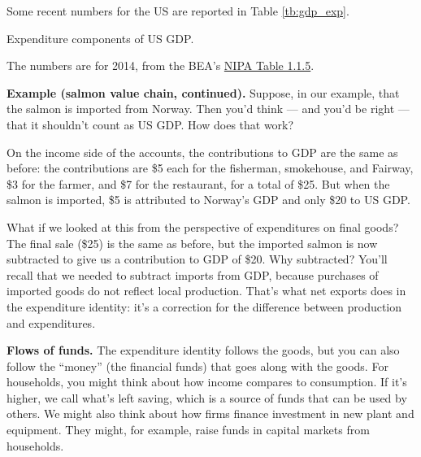 Some recent numbers for the US are reported in Table \ref{tb:gdp_exp}.

\begin{table}[!ht]
\centering
\caption{Expenditure components of US GDP.}
\label{tb:gdp_exp}

\begin{minipage}{0.95\textwidth}
\footnotesize{%
\smallskip
The numbers are for 2014,
from the BEA's
\href{http://www.bea.gov/iTable/iTableHtml.cfm?reqid=9&step=3&isuri=1&903=5}{NIPA Table 1.1.5}.
}
\end{minipage}
\end{table}

\textbf{Example (salmon value chain, continued).}
Suppose, in our example, that the salmon is imported from Norway.
Then you'd think --- and you'd be right --- that it shouldn't
count as US GDP.
How does that work?

On the income side of the accounts, the
contributions to GDP are the same as before:
the contributions are \$5 each for the fisherman,
smokehouse, and Fairway, \$3 for the farmer, and
\$7 for the restaurant, for a total of \$25.
But when the salmon is imported,
\$5 is attributed to Norway's GDP and only \$20 to US GDP.

What if we looked at this from the perspective of expenditures on final goods?
The final sale (\$25) is the same as before, but the imported
salmon is now subtracted to give us a contribution to GDP of \$20.
Why subtracted?  You'll recall that we needed to subtract imports
from GDP, because purchases of imported goods do not reflect
local production.
That's what net exports does in the expenditure identity:
it's a correction for the difference between
production and expenditures.


\textbf{Flows of funds. }
The expenditure identity follows the goods, but you can also follow
the ``money'' (the financial funds) that goes along with the goods.
For households, you might think about how income compares to consumption.
If it's higher, we call what's left saving, which is a source of funds
that can be used by others.
We might also think about how firms finance investment in new plant and equipment.
They might, for example, raise funds in capital markets from households.


